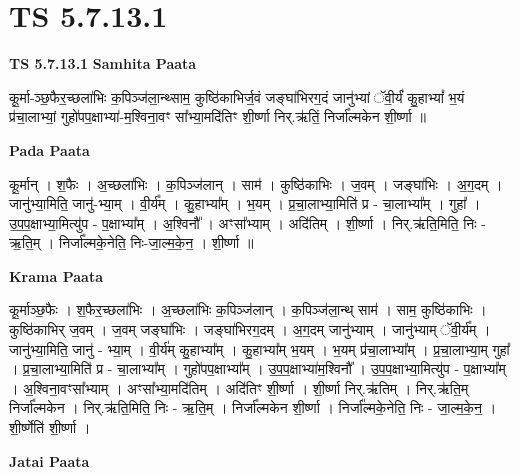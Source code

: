 \documentclass[17pt]{extarticle}
\begin{document}
\section{ TS 5.7.13.1 }

\textbf{TS 5.7.13.1 } \newline
\textbf{Samhita Paata} \newline

कू॒र्मा-ञ्छ॒फैर॒च्छला॑भिः क॒पिञ्ज॑ला॒न्थ्साम॒ कुष्ठि॑काभिर्ज॒वं जङ्घा॑भिरग॒दं जानु॑भ्यां ॅवी॒र्यं॑ कु॒हाभ्यां᳚ भ॒यं प्र॑चा॒लाभ्यां॒ गुहो॑पप॒क्षाभ्या॑-म॒श्विना॒वꣳ सा᳚भ्या॒मदि॑तिꣳ शी॒र्ष्णा निर्.ऋ॑तिं॒ निर्जा᳚ल्मकेन शी॒र्ष्णा ॥ \newline

\textbf{Pada Paata} \newline

कू॒र्मान् । श॒फैः । अ॒च्छला॑भिः । क॒पिञ्ज॑लान् । साम॑ । कुष्ठि॑काभिः । ज॒वम् । जङ्घा॑भिः । अ॒ग॒दम् । जानु॑भ्या॒मिति॒ जानु॑-भ्या॒म् । वी॒र्य᳚म् । कु॒हाभ्या᳚म् । भ॒यम् । प्र॒चा॒लाभ्या॒मिति॑ प्र - चा॒लाभ्या᳚म् । गुहा᳚ । उ॒प॒प॒क्षाभ्या॒मित्यु॑प - प॒क्षाभ्या᳚म् । अ॒श्विनौ᳚ । अꣳसा᳚भ्याम् । अदि॑तिम् । शी॒र्ष्णा । निर्.ऋ॑ति॒मिति॒ निः - ऋ॒ति॒म् । निर्जा᳚ल्मके॒नेति॒ निः-जा॒ल्म॒के॒न॒ । शी॒र्ष्णा ॥  \newline


\textbf{Krama Paata} \newline

कू॒र्माञ्छ॒फैः । श॒फैर॒च्छला॑भिः । अ॒च्छला॑भिः क॒पिञ्ज॑लान् । क॒पिञ्ज॑ला॒न्थ् साम॑ । साम॒ कुष्ठि॑काभिः । कुष्ठि॑काभिर् ज॒वम् । ज॒वम् जङ्घा॑भिः । जङ्घा॑भिरग॒दम् । अ॒ग॒दम् जानु॑भ्याम् । जानु॑भ्याम् ॅवी॒र्य᳚म् । जानु॑भ्या॒मिति॒ जानु॑ - भ्या॒म् । वी॒र्य॑म् कु॒हाभ्या᳚म् । कु॒हाभ्या᳚म् भ॒यम् । भ॒यम् प्र॑चा॒लाभ्या᳚म् । प्र॒चा॒लाभ्या॒म् गुहा᳚ । प्र॒चा॒लाभ्या॒मिति॑ प्र - चा॒लाभ्या᳚म् । गुहो॑पप॒क्षाभ्या᳚म् । उ॒प॒प॒क्षाभ्या॑म॒श्विनौ᳚ । उ॒प॒प॒क्षाभ्या॒मित्यु॑प - प॒क्षाभ्या᳚म् । अ॒श्विना॒वꣳसा᳚भ्याम् । अꣳसा᳚भ्या॒मदि॑तिम् । अदि॑तिꣳ शी॒र्ष्णा । शी॒र्ष्णा निर्.ऋ॑तिम् । निर्.ऋ॑ति॒म् निर्जा᳚ल्मकेन । निर्.ऋ॑ति॒मिति॒ निः - ऋ॒ति॒म् । निर्जा᳚ल्मकेन शी॒र्ष्णा । निर्जा᳚ल्मके॒नेति॒ निः - जा॒ल्म॒के॒न॒ । शी॒र्ष्णेति॑ शी॒र्ष्णा । \newline

\textbf{Jatai Paata} \newline
\end{document}
